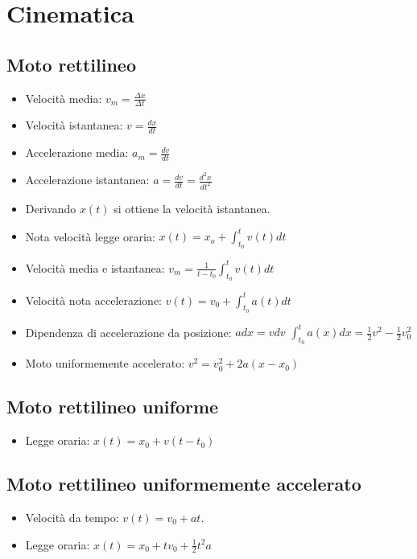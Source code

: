 \section{Cinematica}

	\subsection{Moto rettilineo}
	\begin{itemize}
		\item Velocit\`a media: $v_m = \frac{\Delta x}{\Delta t}$
		\item Velocit\`a istantanea: $v = \frac{dx}{dt}$
		\item Accelerazione media: $a_m = \frac{dv}{dt}$
		\item Accelerazione istantanea: $a = \frac{dv}{dt}=\frac{d^2x}{dt^2}$
		\item Derivando $x(t)$ si ottiene la velocit\`a istantanea.
		\item Nota velocit\`a legge oraria: $x(t) = x_o + \int_{t_0}^{t}v(t)dt$
		\item Velocit\`a media e istantanea: $v_m = \frac{1}{t-t_0}\int_{t_0}^t v(t)dt$
		\item Velocit\`a nota accelerazione: $v(t) = v_0+\int_{t_0}^t a(t)dt$
		\item Dipendenza di accelerazione da posizione: $adx =vdv$ $\int_{t_0}^t a(x)dx = \frac{1}{2}v^2-\frac{1}{2}v_0^2$
		\item Moto uniformemente accelerato: $v^2 = v_0^2 + 2a(x-x_0)$
	\end{itemize}
	\subsection{Moto rettilineo uniforme}
	\begin{itemize}
		\item Legge oraria: $x(t) = x_0 + v(t-t_0)$
	\end{itemize}
	\subsection{Moto rettilineo uniformemente accelerato}
	\begin{itemize}
		\item Velocit\`a da tempo: $v(t) = v_0+at$.
		\item Legge oraria: $x(t) = x_0 + tv_0 + \frac{1}{2}t^2a$
	\end{itemize}
